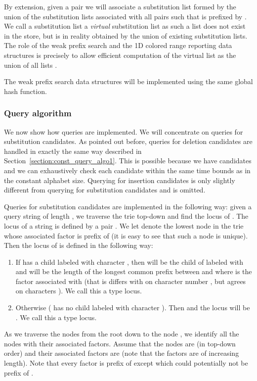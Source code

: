 \documentclass{article}
\newcommand{\?}{\mskip1.5mu}
\begin{document}
By extension, given a pair  we will associate a substitution list formed by the union of the substitution lists associated with all pairs  such that  is prefixed by . We call a substitution list  a \emph{virtual} substitution list as such a list does not exist in the store, but is in reality obtained by the union of existing  substitution lists. The role of the weak prefix search and the 1D colored range reporting data structures is precisely to allow efficient computation of the virtual list  as the union of all lists . 

The  weak prefix search data structures will be implemented using the same global hash function. 
\subsubsection{Query algorithm}

We now show how queries are implemented. We will concentrate on queries for substitution candidates. As pointed out before, queries for deletion candidates are handled in exactly the same way described in Section~\ref{section:const_query_algo1}. This is possible because we have  candidates and we can exhaustively check each candidate within the same time bounds as in the constant alphabet size. Querying for insertion candidates is only slightly different from querying for substitution candidates and is omitted. 

Queries for substitution candidates are implemented in the following way: given a query string  of length , we traverse the trie top-down and find the locus of . The locus of a string  is defined by a pair . We let  denote the lowest node  in the trie whose associated factor  is prefix of  (it is easy to see that such a node is unique). Then the locus  of  is defined in the following way: 
\begin{enumerate}
\item If  has a child labeled with character , then  will be the child of  labeled with  and  will be the length of the longest common prefix between  and  where  is the factor associated with  (that is  differs with  on character number , but agrees on characters ). We call this a type  locus. 
\item Otherwise ( has no child labeled with character ). Then  and the locus will be . We call this a type  locus. 
\end{enumerate}
As we traverse the nodes from the root down to the node , we identify all the nodes with their associated factors. Assume that the nodes are (in top-down order)  and their associated factors are  (note that the factors are of increasing length). Note that every factor  is prefix of  except  which could potentially not be prefix of . 
\end{document}
